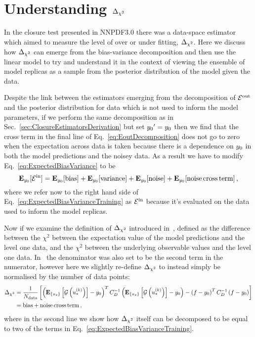 \section{Understanding $\Delta_{\chi^2}$}

In the closure test presented in NNPDF3.0 \cite{nnpdf30} there was a data-space
estimator which aimed to measure the level of over or under fitting, $\Delta_{\chi^2}$.
Here we discuss how $\Delta_{\chi^2}$ can emerge from the bias-variance decomposition
and then use the linear model to try and understand it in the context of
viewing the ensemble of model replicas as a sample from the posterior distribution
of the model given the data.

Despite the link between the estimators emerging from the decomposition of
$\mathcal{E}^{\rm out}$ and the posterior distribution for data which is not used to inform
the model parameters, if we perform the same decomposition as in
Sec.~\ref{sec:ClosureEstimatorsDerivation} but set
${{y_0}^{\prime}}=y_0$ then we find that the cross term
in the final line of Eq.~\ref{eq:EoutDecomposition} does not go to zero when
the expectation across data is taken because there is a dependence on
$y_0$ in both the model predictions and the noisey data. As a result
we have to modify Eq.~\ref{eq:ExpectedBiasVariance} to be
\begin{equation}\label{eq:ExpectedBiasVarianceTraining}
    \mathbf{E}_{y_0}[\mathcal{E}^{\rm in}] =
    \mathbf{E}_{y_0}[{\rm bias}] + 
    \mathbf{E}_{y_0}[{\rm variance}] +
    \mathbf{E}_{y_0}[{\rm noise}] +
    \mathbf{E}_{y_0}[{\rm noise \, cross \, term}]\, ,
\end{equation}
where we refer now to the right hand side of
Eq.~\ref{eq:ExpectedBiasVarianceTraining} as $\mathcal{E}^{\rm in}$ because it's evaluated on the
data used to inform the model replicas.

Now if we examine the definition of $\Delta_{\chi^2}$ introduced
in~\cite{Ball:2014uwa}, defined as the difference between the
$\chi^2$ between the expectation value of the model predictions and the level
one data, and the $\chi^2$ between the underlying observable values and the
level one data. In~\cite{Ball:2014uwa} the denominator was also set to be the
second term in the numerator, however here we slightly re-define
$\Delta_{\chi^2}$ to instead simply be normalised by the number of data points:
\begin{equation}\label{eq:deltachi2def1}
    \begin{split}
        \Delta_{\chi^2} &= \frac{1}{N_{\rm data}} \left[
            \left( \mathbf{E}_{\{ u_* \}} \left[ \mathcal{G}\left(u_*^{(k)}\right) \right] - y_0 \right)^T
            C_{D}^{-1}
            \left( \mathbf{E}_{\{ u_* \}} \left[ \mathcal{G}\left(u_*^{(k)}\right) \right] - y_0 \right) - 
            \left( f - y_0 \right)^T
            C_{D}^{-1}
            \left( f - y_0 \right)
        \right] \\
        &= {\rm bias} + {\rm noise \, cross \, term} \, ,
    \end{split}
\end{equation}
where in the second line we show how $\Delta_{\chi^2}$ itself can be decomposed to
be equal to two of the terms in Eq.~\ref{eq:ExpectedBiasVarianceTraining}.

